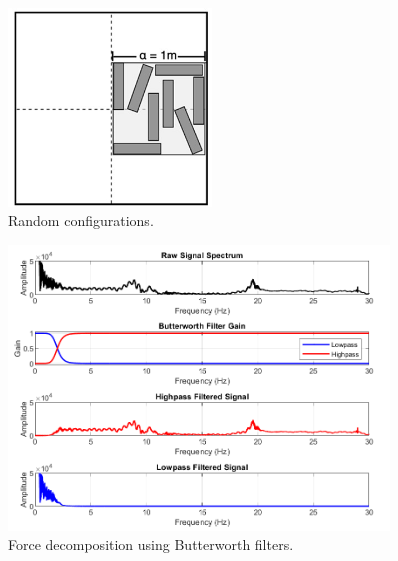 \documentclass{article}
\begin{document}
\begin{figure}[htbp]
    \centering
    \includegraphics[width=0.48\textwidth]{configurations_rand.jpg}
    \caption{Random configurations.}
    \label{fig:configurations_random}
\end{figure}

\begin{figure}[htbp] \centering \includegraphics[width=0.9\textwidth]{high_low_pass.png} \caption{Force decomposition using Butterworth filters.} \label{fig:high_low_pass} \end{figure}
\end{document}
